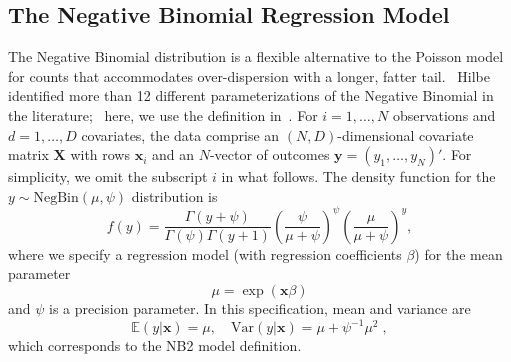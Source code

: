 \documentclass[a4paper,UKenglish]{oasics-v2016}
\begin{document}
\subsection{The Negative Binomial Regression Model}
The Negative Binomial distribution is a flexible alternative to the Poisson model for counts that accommodates over-dispersion with a longer, fatter tail.~\cite{hu}
Hilbe identified more than 12 different parameterizations of the Negative Binomial in the literature;~\cite{hilbe} here, we use the definition in~\cite{DebTrivedi}.  
For $i=1,\ldots,N$ observations and $d=1,\ldots,D$ covariates, the data comprise an $(N,D)$-dimensional covariate matrix $\mathbf{X}$ with rows $\mathbf{x}_i$ and an $N$-vector of outcomes $\mathbf{y} = (y_1,\ldots,y_N)'$. For simplicity, we omit the subscript $i$ in what follows.
The density function for the $y \sim \text{NegBin}(\mu,\psi)$ distribution is
$$
f(y) = \frac{\Gamma(y+\psi)}{\Gamma(\psi)\Gamma(y+1)}\left( \frac{\psi}{\mu+\psi} \right)^{\psi} \left( \frac{\mu}{\mu + \psi} \right)^{y},
$$
where we specify a regression model (with regression coefficients $\beta$) for the mean parameter
$$
\mu = \exp(\mathbf{x}\beta)
$$
and $\psi$ is a precision parameter.
In this specification, mean and variance are
$$
\mathbb{E}(y|\mathbf{x}) =\mu, \quad \text{Var}(y|\mathbf{x})= \mu+\psi^{-1} \mu^{2}\;,
$$
which corresponds to the NB2 model definition.~\cite{cameron}
\end{document}
